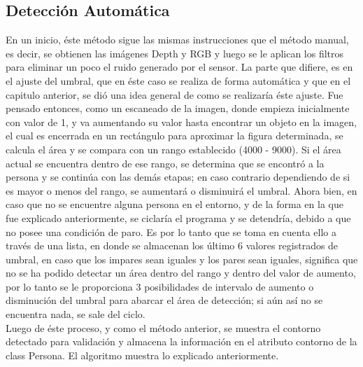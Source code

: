\documentclass[a4paper,openright,12pt]{report}
\begin{document}
\subsection{Detección Automática}
En un inicio, éste método sigue las mismas instrucciones que el método manual, es decir, se obtienen las imágenes Depth y RGB y luego se le aplican los filtros para eliminar un poco el ruido generado por el sensor. La parte que difiere, es en el ajuste del umbral, que en éste caso se realiza de forma automática y que en el capitulo anterior, se dió una idea general de como se realizaría éste ajuste. Fue pensado entonces, como un escaneado de la imagen, donde empieza inicialmente con valor de 1, y va aumentando su valor hasta encontrar un objeto en la imagen, el cual es encerrada en un rectángulo para aproximar la figura determinada, se calcula el área y se compara con un rango establecido (4000 - 9000). Si el área actual se encuentra dentro de ese rango, se determina que se encontró a la persona y se continúa con las demás etapas; en caso contrario dependiendo de si es mayor o menos del rango, se aumentará o disminuirá el umbral. Ahora bien, en caso que no se encuentre alguna persona en el entorno, y de la forma en la que fue explicado anteriormente, se ciclaría el programa y se detendría, debido a que no posee una condición de paro. Es por lo tanto que se toma en cuenta ello a través de una lista, en donde se almacenan los último 6 valores registrados de umbral, en caso que los impares sean iguales y los pares sean iguales, significa que no se ha podido detectar un área dentro del rango y dentro del valor de aumento, por lo tanto se le proporciona 3 posibilidades de intervalo de aumento o disminución del umbral para abarcar el área de detección; si aún así no se encuentra nada, se sale del ciclo.\\
Luego de éste proceso, y como el método anterior, se muestra el contorno detectado para validación y almacena la información en el atributo contorno de la class Persona. El algoritmo muestra lo explicado anteriormente.
\end{document}

